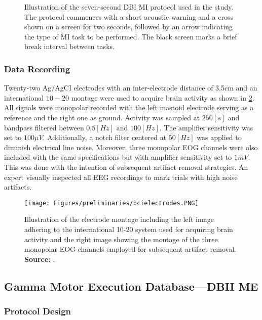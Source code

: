 \begin{figure}[h!]
\centering
    \resizebox{0.5\linewidth}{!}{}
    \caption{Illustration of the seven-second DBI MI protocol used in the study. The protocol commences with a short acoustic warning and a cross shown on a screen for two seconds, followed by an arrow indicating the type of MI task to be performed. The black screen marks a brief break interval between tasks.
    \label{fig:BCI2aprotocol}}
\end{figure}

\subsubsection{Data Recording}

Twenty-two Ag/AgCI electrodes with an inter-electrode distance of 3.5cm and an international $10-20$ montage were used to acquire brain activity as shown in \cref{fig:montagebci2a}. All signals were monopolar recorded with the left mastoid electrode serving as a reference and the right one as ground. Activity was sampled at $250[s]$ and bandpass filtered between $0.5[Hz]$ and $100[Hz]$. The amplifier sensitivity was set to $100 \mu V$. Additionally, a notch filter centered at $50[Hz]$ was applied to diminish electrical line noise. Moreover, three monopolar EOG channels were also included with the same specifications but with amplifier sensitivity set to $1mV$. This was done with the intention of subsequent artifact removal strategies. An expert visually inspected all EEG recordings to mark trials with high noise artifacts.

\begin{figure}[h!]
\centering
    \texttt{[image: Figures/preliminaries/bcielectrodes.PNG]}
    \caption{Illustration of the electrode montage including the left image adhering to the international 10-20 system used for acquiring brain activity and the right image showing the montage of the three monopolar EOG channels employed for subsequent artifact removal. \textbf{Source:} \cite{brunner2008bci}. \label{fig:montagebci2a}}
\end{figure}

\subsection{Gamma Motor Execution Database---DBII ME}

\subsubsection{Protocol Design}


